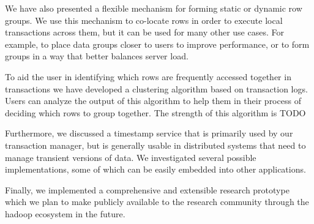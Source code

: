 \documentclass[10pt,final,journal]{IEEEtran}
\begin{document}
We have also presented a flexible mechanism for forming static or dynamic row groups. We use this mechanism to co-locate rows in order to execute local transactions across them, but it can be used for many other use cases. For example, to place data groups closer to users to improve performance, or to form groups in a way that better balances server load.

To aid the user in identifying which rows are frequently accessed together in transactions we have developed a clustering algorithm based on transaction logs. Users can analyze the output of this algorithm to help them in their process of deciding which rows to group together. The strength of this algorithm is TODO

Furthermore, we discussed a timestamp service that is primarily used by our transaction manager, but is generally usable in distributed systems that need to manage transient versions of data. We investigated several possible implementations, some of which can be easily embedded into other applications.

Finally, we implemented a comprehensive and extensible research prototype which we plan to make publicly available to the research community through the hadoop ecosystem in the future.




\end{document}
